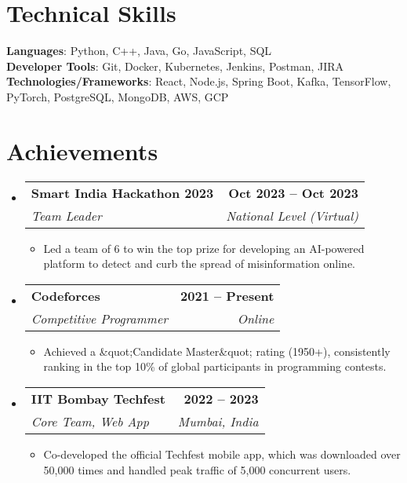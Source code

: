 \documentclass[letterpaper,11pt]{article}
\makeatletter
\newcommand{\resumeItem}[1]{\item\small{#1 \vspace{-2pt}}}
\newcommand{\resumeSubheading}[4]{
  \vspace{-2pt}\item
    \begin{tabular*}{1.0\textwidth}[t]{l@{\extracolsep{\fill}}r}
      \textbf{#1} & \textbf{\small #2} \\
      \textit{\small#3} & \textit{\small #4} \\
    \end{tabular*}\vspace{-7pt}
}
\newcommand{\resumeSubHeadingListStart}{\begin{itemize}[leftmargin=0.0in, label={}]}
\newcommand{\resumeSubHeadingListEnd}{\end{itemize}}
\newcommand{\resumeItemListStart}{\begin{itemize}}
\newcommand{\resumeItemListEnd}{\end{itemize}\vspace{-5pt}}
\makeatother
\begin{document}
\section{Technical Skills}
\begin{itemize}[leftmargin=0.15in, label={}]
  \small{\item{
    \textbf{Languages}{: Python, C++, Java, Go, JavaScript, SQL } \\
    \textbf{Developer Tools}{: Git, Docker, Kubernetes, Jenkins, Postman, JIRA } \\
    \textbf{Technologies/Frameworks}{: React, Node.js, Spring Boot, Kafka, TensorFlow, PyTorch, PostgreSQL, MongoDB, AWS, GCP } \\
  }}
\end{itemize}
\vspace{-16pt}

\section{Achievements}
\resumeSubHeadingListStart
  \resumeSubheading
    { Smart India Hackathon 2023 }{ Oct 2023 -- Oct 2023 }
    { Team Leader }{ National Level (Virtual) }
    \resumeItemListStart
      \resumeItem{ Led a team of 6 to win the top prize for developing an AI-powered platform to detect and curb the spread of misinformation online. }
    \resumeItemListEnd

  \resumeSubheading
    { Codeforces }{ 2021 -- Present }
    { Competitive Programmer }{ Online }
    \resumeItemListStart
      \resumeItem{ Achieved a &quot;Candidate Master&quot; rating (1950+), consistently ranking in the top 10\% of global participants in programming contests. }
    \resumeItemListEnd
    
  \resumeSubheading
    { IIT Bombay Techfest }{ 2022 -- 2023 }
    { Core Team, Web  App }{ Mumbai, India }
    \resumeItemListStart
      \resumeItem{ Co-developed the official Techfest mobile app, which was downloaded over 50,000 times and handled peak traffic of 5,000 concurrent users. }
    \resumeItemListEnd
\resumeSubHeadingListEnd
\end{document}
